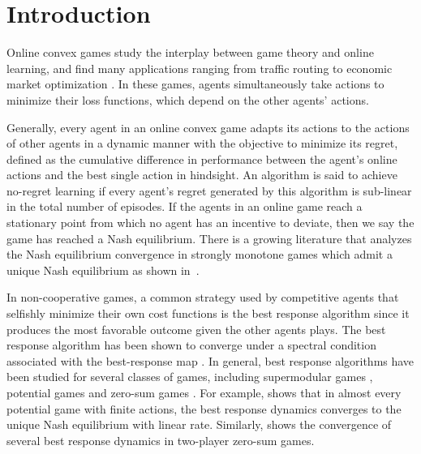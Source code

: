 \section{Introduction}
Online convex games study the interplay between game theory and online learning, and find many applications ranging from traffic routing \cite{sessa2019no} to economic market optimization \cite{wang2022risk,lin2020finite}. 
%
In these games, agents simultaneously take actions to minimize their loss functions, which depend on the other agents' actions.
%


Generally, every agent in an online convex game adapts its actions to the actions of other agents in a dynamic manner with the objective to minimize its regret, defined as the cumulative difference in performance between the agent's online actions and the best single action in hindsight.
%
An algorithm is said to achieve no-regret learning if every agent's regret generated by this algorithm is sub-linear in the total number of episodes.
%
If the agents in an online game reach a stationary point from which no agent has an incentive to deviate, then we say the game has reached a Nash equilibrium.
%
There is a growing literature \cite{tatarenko2018learning,bravo2018bandit,drusvyatskiy2021improved,mertikopoulos2019learning,wang2022zeroth} that analyzes the Nash equilibrium convergence in strongly monotone games which admit a unique Nash equilibrium as shown in~\cite{rosen1965existence}.


In non-cooperative games, a common strategy used by competitive agents that selfishly minimize their own cost functions is the best response algorithm since it produces the most favorable outcome given the other agents plays.
%
The best response algorithm has been shown to converge under a spectral condition associated with the best-response map \cite{shanbhag2016inexact,facchinei201012}.
%
In general, best response algorithms have been studied for several classes of games, including supermodular games \cite{milgrom1990rationalizability}, potential games \cite{pass2019course,swenson2018best,lei2017randomized} and zero-sum games \cite{leslie2020best}. 
%
For example, \cite{swenson2018best} shows that in almost every potential game with finite actions, the best response dynamics converges to the unique Nash equilibrium with linear rate. 
%
Similarly, \cite{leslie2020best} shows the convergence of several best response dynamics in two-player zero-sum games.





